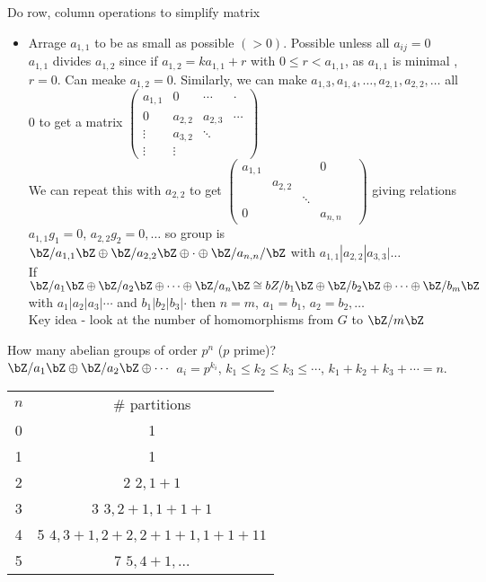 \noindent
Do row, column operations to simplify matrix 
\begin{itemize}
    \item Arrage $a_{1,1}$ to be as small as possible $(>0)$. Possible unless all $a_{ij}=0$ \\
    $a_{1,1}$ divides $a_{1,2}$ since if $a_{1,2} = ka_{1,1} + r$ with $0 \le r < a_{1,1}$, as $a_{1,1}$ is minimal , $r=0$. Can meake $a_{1,2}=0$. Similarly, we can make $a_{1,3}, a_{1,4}, \ldots, a_{2,1}, a_{2,2}, \ldots $ all 0 to get a matrix $\begin{pmatrix} a_{1,1} & 0 & \cdots & \cdot \\ 0 & a_{2,2} & a_{2,3} & \cdots \\ \vdots & a_{3,2} & \ddots & \\ \vdots &\vdots \end{pmatrix}$ \\
    We can repeat this with $a_{2,2}$ to get $\begin{pmatrix} a_{1,1} & & & 0 \\ & a_{2,2} & & & \\ & & \ddots & \\ 0 & & &a_{n, n} \end{pmatrix}$ giving relations $a_{1,1}g_1=0$, $a_{2,2}g_2 = 0, \ldots$ so group is $\bZ/a_{1,1}\bZ \oplus \bZ/a_{2,2}\bZ \oplus \cdot \oplus \bZ/a_{n,n}/\bZ$ with $a_{1,1} | a_{2,2} | a_{3,3} | \ldots$ \\
    If $\bZ/a_1\bZ \oplus \bZ/a_2\bZ \oplus \cdots \oplus \bZ/a_n\bZ \cong bZ/b_1\bZ \oplus \bZ/b_2\bZ \oplus \cdots \oplus \bZ/b_m\bZ$ with $a_1 | a_2 | a_3| \cdots$ and $b_1 | b_2 |b_3 | \cdot$ then $n=m$, $a_1=b_1$, $a_2=b_2, \ldots$ \\
    Key idea - look at the number of homomorphisms from $G$ to $\bZ/m\bZ$  
\end{itemize}

\noindent
How many abelian groups of order $p^n$ ($p$ prime)? \\
$\bZ/a_1\bZ \oplus \bZ/a_2\bZ \oplus \cdots $ $a_i = p^{k_i}$, $k_1 \le k_2 \le k_3 \le \cdots$, $k_1 + k_2 + k_3 + \cdots = n$. \\
\begin{tabular}{c|c}
    $n$ & \# partitions \\ 
    0 & 1 \\
    1 & 1 \quad 1\\ 
    2 & 2 \quad $2, 1+ 1$ \\
    3 & 3 \quad $3, 2+ 1, 1+ 1+ 1$ \\
    4 & 5 \quad $4, 3+1, 2+2, 2+1+1, 1+1+11$ \\
    5 & 7 \quad $5, 4+1, \ldots$
\end{tabular} 

